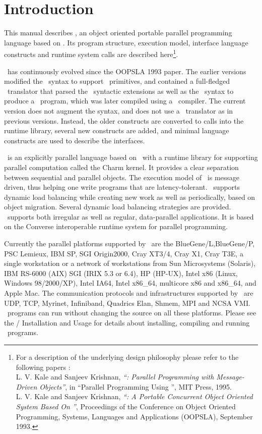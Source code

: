 \section{Introduction}

This manual describes \charmpp, an object oriented portable parallel
programming language based on \CC. Its program structure, execution
model, interface language constructs and runtime system calls are
described here\footnote{For a description of the underlying design
philosophy please refer to the following papers :\\
    L. V. Kale and Sanjeev Krishnan,
    {\em ``\charmpp : Parallel Programming with Message-Driven Objects''},
    in ``Parallel Programming Using \CC'',
    MIT Press, 1995. \\
    L. V. Kale and Sanjeev Krishnan,
    {\em ``\charmpp : A Portable Concurrent Object Oriented System
    Based On \CC''},
    Proceedings of the Conference on Object Oriented Programming,
    Systems, Languages and Applications (OOPSLA), September 1993.
}.

\charmpp\ has continuously evolved since the OOPSLA 1993 paper.  The earlier
versions modified the \CC\ syntax to support \charmpp\ primitives, and
contained a full-fledged \charmpp\ translator that parsed the \charmpp\
syntactic extensions as well as the \CC\ syntax to produce a \CC\ program,
which was later compiled using a \CC\ compiler.  The current version does not
augment the \CC{} syntax, and does not use a \charmpp\ translator as in previous
versions. Instead, the older constructs are converted to calls into the runtime
library, several new constructs are added, and minimal language constructs are
used to describe the interfaces.

\charmpp\ is an explicitly parallel language based on \CC\ with a runtime
library for supporting parallel computation called the Charm kernel.  It
provides a clear separation between sequential and parallel objects.  The
execution model of \charmpp\ is message driven, thus helping one write programs
that are latency-tolerant.  \charmpp\ supports dynamic load balancing while
creating new work as well as periodically, based on object migration.  Several
dynamic load balancing strategies are provided.  \charmpp\ supports both
irregular as well as regular, data-parallel applications.  It is based on the
{\sc Converse} interoperable runtime system for parallel programming.

Currently the parallel platforms supported by \charmpp\ are the BlueGene/L,BlueGene/P, PSC
Lemieux, IBM SP, SGI Origin2000, Cray XT3/4, Cray X1, Cray T3E, a single workstation or a
network of workstations from Sun Microsystems (Solaris), IBM RS-6000 (AIX) SGI
(IRIX 5.3 or 6.4), HP (HP-UX), Intel x86 (Linux, Windows 98/2000/XP), Intel
IA64, Intel x86\_64, multicore x86 and x86\_64, and Apple Mac. The communication protocols and infrastructures supported
by \charmpp\ are UDP, TCP, Myrinet, Infiniband, Quadrics Elan, Shmem, MPI and
NCSA VMI.  \charmpp\ programs can run without changing the source on all these
platforms.  Please see the \charmpp{}/\converse{} Installation and
Usage 
for details about installing, compiling and running \charmpp\ programs.

